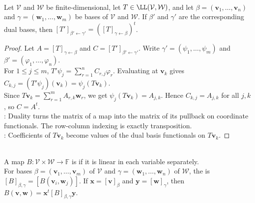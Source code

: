 \begin{theorem} \label{thm:matrix-of-dual-map-is-transpose} \\
Let $\mathcal{V}$ and $\mathcal{W}$ be finite-dimensional, let $T\in\LL(\mathcal{V},\mathcal{W})$, and let $\beta=(\mathbf{v}_1,\ldots,\mathbf{v}_n)$ and $\gamma=(\mathbf{w}_1,\ldots,\mathbf{w}_m)$ be bases of $\mathcal{V}$ and $\mathcal{W}$. If $\beta'$ and $\gamma'$ are the corresponding dual bases, then $[T']_{\beta'\leftarrow\gamma'}=\left([T]_{\gamma\leftarrow\beta}\right)^t$.
\begin{proof}
Let $A=[T]_{\gamma\leftarrow\beta}$ and $C=[T']_{\beta'\leftarrow\gamma'}$. Write $\gamma'=(\psi_1,\ldots,\psi_m)$ and $\beta'=(\varphi_1,\ldots,\varphi_n)$.\\
For $1\leq j\leq m$, $T'\psi_j=\sum\limits_{r=1}^n C_{r,j}\varphi_r$.
Evaluating at $\mathbf{v}_k$ gives $C_{k,j}=(T'\psi_j)(\mathbf{v}_k)=\psi_j(T\mathbf{v}_k)$.\\
Since $T\mathbf{v}_k=\sum\limits_{r=1}^m A_{r,k}\mathbf{w}_r$, we get $\psi_j(T\mathbf{v}_k)=A_{j,k}$. Hence $C_{k,j}=A_{j,k}$ for all $j,k$, so $C=A^t$.\\
: Duality turns the matrix of a map into the matrix of its pullback on coordinate functionals. The row-column indexing is exactly transposition.\\
: Coefficients of $T\mathbf{v}_k$ become values of the dual basis functionals on $T\mathbf{v}_k$.
\end{proof}
\end{theorem}

\begin{definition} \label{def:bilinear-form-and-matrix} \\
A map $B:\mathcal{V}\times\mathcal{W}\to\mathbb{F}$ is  if it is linear in each variable separately.\\
For bases $\beta=(\mathbf{v}_1,\ldots,\mathbf{v}_m)$ of $\mathcal{V}$ and $\gamma=(\mathbf{w}_1,\ldots,\mathbf{w}_n)$ of $\mathcal{W}$, the  is $[B]_{\beta,\gamma}=[B(\mathbf{v}_i,\mathbf{w}_j)]$. If $\mathbf{x}=[\mathbf{v}]_{\beta}$ and $\mathbf{y}=[\mathbf{w}]_{\gamma}$, then $B(\mathbf{v},\mathbf{w})=\mathbf{x}^t [B]_{\beta,\gamma}\mathbf{y}$.
\end{definition}

